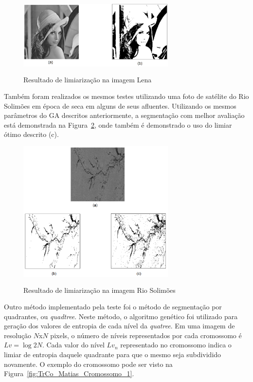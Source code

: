 \documentclass[12pt,oneside,a4paper,english,french,spanish,brazil,]{abntex2}
\begin{document}
\begin{figure}[ht]
\centering
\caption{Resultado de limiarização na imagem Lena}
\includegraphics[width=0.7\textwidth]{imagens/TrCo_Matias_Limiar_1.PNG}
\label{fig:TrCo_Matias_Limiar_1}
\end{figure}

Também foram realizados os mesmos testes utilizando uma foto de satélite do Rio Solimões em época de seca em alguns de seus afluentes. Utilizando os mesmos parâmetros do GA descritos anteriormente, a segmentação com melhor avaliação está demonstrada na Figura~\ref{fig:TrCo_Matias_Limiar_2}, onde também é demonstrado o uso do limiar ótimo descrito \cite{gonzalez:2012} (c).

\begin{figure}[ht]
\centering
\caption{Resultado de limiarização na imagem Rio Solimões}
\includegraphics[width=0.7\textwidth]{imagens/TrCo_Matias_Limiar_2.PNG}
\label{fig:TrCo_Matias_Limiar_2}
\end{figure}

Outro método implementado pela teste foi o método de segmentação por quadrantes, ou \textit{quadtree}. Neste método, o algoritmo genético foi utilizado para geração dos valores de entropia de cada nível da \textit{quatree}. Em uma imagem de resolução \(N\)x\(N\) pixels, o número de níveis representados por cada cromossomo é \(Lv=\log 2 N\). Cada valor do nível \(Lv_n\) representado no cromossomo indica o limiar de entropia daquele quadrante para que o mesmo seja subdividido novamente. O exemplo do cromossomo pode ser visto na Figura~\ref{fig:TrCo_Matias_Cromossomo_1}.
\end{document}
